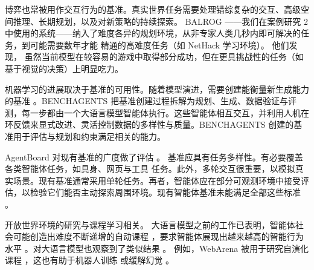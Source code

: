 

博弈也常被用作交互行为的基准。真实世界任务需要处理错综复杂的交互、高级空间推理、长期规划，以及对新策略的持续探索。
BALROG \citep{paglieri2024balrog}——我们在案例研究 2 中使用的系统——纳入了难度各异的规划环境，从非专家人类几秒内即可解决的任务，到可能需要数年才能
精通的高难度任务（如 NetHack 学习环境）。
他们发现，
虽然当前模型在较容易的游戏中取得部分成功，但在更具挑战性的任务（如基于视觉的决策）上明显吃力。

机器学习的进展取决于基准的可用性。随着模型演进，需要创建能衡量新生成能力的基准 \citep{butt2024benchagents}。BENCHAGENTS 把基准创建过程拆解为规划、生成、数据验证与评测，每一步都由一个大语言模型智能体执行。这些智能体相互交互，并利用人机在环反馈来显式改进、灵活控制数据的多样性与质量。BENCHAGENTS 创建的基准用于评估与规划和约束满足相关的能力。

AgentBoard 对现有基准的广度做了评估 \citep{ma2024agentboard}。
基准应具有任务多样性。有必要覆盖各类智能体任务，如具身、网页与工具
任务。此外，多轮交互很重要，以模拟真实场景。现有基准通常采用单轮任务。再者，智能体应在部分可观测环境中接受评估，以检验它们能否主动探索周围环境。现有智能体基准未能满足全部这些标准 \citep{ma2024agentboard}。

开放世界环境的研究与课程学习相关。
大语言模型之前的工作已表明，智能体社会可能创造出难度不断递增的自动课程 \citep{elman1991incremental, bengio2009curriculum, silver2017mastering, soviany2022curriculum}，要求智能体展现出越来越高的智能行为水平 \citep{racaniere2019automated}。对大语言模型也观察到了类似结果 \citep{feng2023citing}。
例如，WebArena 被用于研究自演化课程 \citep{qi2024webrl}，这也有助于机器人训练 \citep{ryu2024curricullm} 或缓解幻觉 \citep{zhao2024automatic}。

